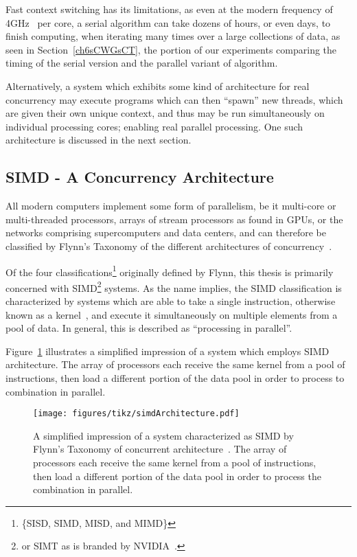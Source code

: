 Fast context switching has its limitations, as even at the modern frequency of 4GHz~\cite{CPUBenchmark} per core, a serial algorithm can take dozens of hours, or even days, to finish computing, when iterating many times over a large collections of data, as seen in Section~\ref{ch6sCWGsCT}, the portion of our experiments comparing the timing of the serial version and the parallel variant of  algorithm.

Alternatively, a system which exhibits some kind of architecture for real concurrency may execute programs which can then ``spawn'' new threads, which are given their own unique context, and thus may be run simultaneously on individual processing cores; enabling real parallel processing. One such architecture is discussed in the next section.

%
%
%
%
\subsection{SIMD - A Concurrency Architecture}
\label{ch2sPPssSACA}
All modern computers implement some form of parallelism, be it multi-core or multi-threaded processors, arrays of stream processors as found in GPUs, or the networks comprising supercomputers and data centers, and can therefore be classified by Flynn's Taxonomy of the different architectures of concurrency~\cite{Flynn72}.

Of the four classifications\footnote{\{SISD, SIMD, MISD, and MIMD\}} originally defined by Flynn, this thesis is primarily concerned with \gls{SIMD}\footnote{or SIMT as is branded by NVIDIA~\cite[p.~70-72]{CUDA18}.} systems. As the name implies, the \gls{SIMD} classification is characterized by systems which are able to take a single instruction, otherwise known as a \gls{kernel}~\cite[p.~8]{CUDA18}, and execute it simultaneously on multiple elements from a pool of data. In general, this is described as ``processing in parallel''.

Figure~\ref{fig:simdArchitecture} illustrates a simplified impression of a system which employs SIMD architecture. The array of processors each receive the same kernel from a pool of instructions, then load a different portion of the data pool in order to process to combination in parallel.

\begin{figure}[ht]
\ffigbox
	{\texttt{[image: figures/tikz/simdArchitecture.pdf]}}
	{\caption[SIMD Architecture]{A simplified impression of a system characterized as SIMD by Flynn's Taxonomy of concurrent architecture~\cite{Flynn72}. The array of processors each receive the same kernel from a pool of instructions, then load a different portion of the data pool in order to process the combination in parallel.}\label{fig:simdArchitecture}}
\end{figure}

